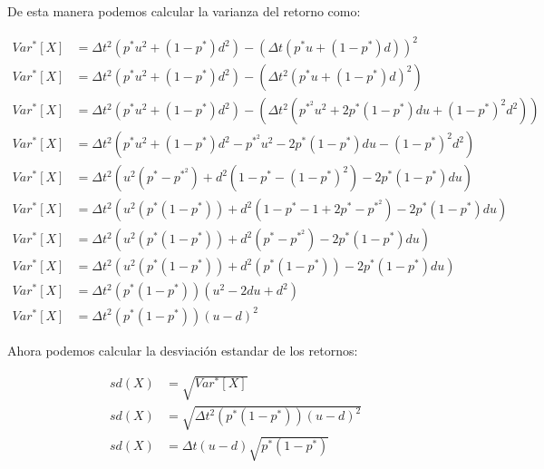 \documentclass{article}
\theoremstyle{remark}
\theoremstyle{definition}
\begin{document}
    De esta manera podemos calcular la varianza del retorno como:

    \begin{align*}
        Var^{*}\left[X\right] &= \Delta t^{2}\left(p^{*}u^{2}+(1-p^{*})d^{2}\right) -\left(\Delta t \left(p^{*}u+(1-p^{*})d\right)\right)^{2} \\
        Var^{*}\left[X\right] &= \Delta t^{2}\left(p^{*}u^{2}+(1-p^{*})d^{2}\right) -\left(\Delta t^{2} \left(p^{*}u+(1-p^{*})d\right)^{2}\right) \\
        Var^{*}\left[X\right] &= \Delta t^{2}\left(p^{*}u^{2}+(1-p^{*})d^{2}\right) -\left(\Delta t^{2} \left(p^{*^2}u^{2}+2p^{*}(1-p^{*})du+(1-p^{*})^{2}d^{2}\right)\right) \\
        Var^{*}\left[X\right] &= \Delta t^{2} \left(p^{*}u^{2}+(1-p^{*})d^{2} - p^{*^2}u^{2}-2p^{*}(1-p^{*})du-(1-p^{*})^{2}d^{2} \right) \\
        Var^{*}\left[X\right] &= \Delta t^{2} \left(u^{2}\left(p^{*}-p^{*^{2}}\right)+d^{2}\left(1-p^{*}-\left(1-p^{*}\right)^{2}\right) -2p^{*}(1-p^{*})du \right) \\
        Var^{*}\left[X\right] &= \Delta t^{2} \left(u^{2}\left(p^{*}\left(1-p^{*}\right)\right)+d^{2}\left(1-p^{*}-1+2p^{*}-p^{*^{2}}\right) -2p^{*}(1-p^{*})du \right) \\
        Var^{*}\left[X\right] &= \Delta t^{2} \left(u^{2}\left(p^{*}\left(1-p^{*}\right)\right)+d^{2}\left(p^{*}-p^{*^{2}}\right) -2p^{*}(1-p^{*})du \right) \\
        Var^{*}\left[X\right] &= \Delta t^{2} \left(u^{2}\left(p^{*}\left(1-p^{*}\right)\right)+d^{2}\left(p^{*}(1-p^{*})\right) -2p^{*}(1-p^{*})du \right) \\
        Var^{*}\left[X\right] &= \Delta t^{2}\left(p^{*}\left(1-p^{*}\right)\right) \left(u^{2}-2du+d^{2} \right) \\
        Var^{*}\left[X\right] &= \Delta t^{2}\left(p^{*}\left(1-p^{*}\right)\right) \left(u-d\right)^{2}
    \end{align*}

    Ahora podemos calcular la desviaci\'on estandar de los retornos:

    \begin{align*}
        sd(X) &= \sqrt{Var^{*}\left[X\right]} \\
        sd(X) &= \sqrt{\Delta t^{2}\left(p^{*}\left(1-p^{*}\right)\right) \left(u-d\right)^{2}} \\
        sd(X) &= \Delta t\left(u- d\right) \sqrt{p^{*}\left(1-p^{*}\right)}
    \end{align*}
\end{document}
